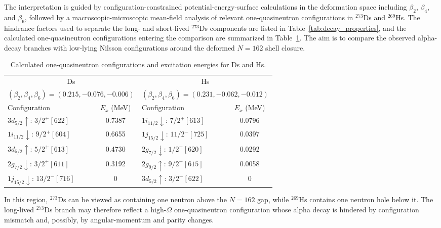 \documentclass[11pt]{article}
\begin{document}
The interpretation is guided by configuration-constrained potential-energy-surface calculations in the deformation space including $\beta_2$, $\beta_4$, and $\beta_6$, followed by a macroscopic-microscopic mean-field analysis of relevant one-quasineutron configurations in $^{273}$Ds and $^{269}$Hs. The hindrance factors used to separate the long- and short-lived $^{273}$Ds components are listed in Table~\ref{tab:decay_properties}, and the calculated one-quasineutron configurations entering the comparison are summarized in Table~\ref{tab:configurations_Ds_Hs}. The aim is to compare the observed alpha-decay branches with low-lying Nilsson configurations around the deformed $N=162$ shell closure.
\begin{table}[htbp]
    \centering
    \caption{Calculated one-quasineutron configurations and excitation energies for Ds and Hs.}
    \label{tab:configurations_Ds_Hs}
    \begin{tabular}{l c l c}
        \toprule
        \multicolumn{2}{c}{Ds} &
        \multicolumn{2}{c}{Hs} \\
        \multicolumn{2}{c}{$(\beta_2,\beta_4,\beta_6)
        =(0.215,-0.076,-0.006)$} &
        \multicolumn{2}{c}{$(\beta_2,\beta_4,\beta_6)
        =(0.231,-0.062,-0.012)$} \\
        \cmidrule(lr){1-2}
        \cmidrule(lr){3-4}
        Configuration & $E_x$ (MeV) &
        Configuration & $E_x$ (MeV) \\
        \midrule
        $3d_{5/2}\uparrow:\,3/2^{+}[622]$
            & 0.7387
            & $1i_{11/2}\downarrow:\,7/2^{+}[613]$
            & 0.0796 \\
        $1i_{11/2}\downarrow:\,9/2^{+}[604]$
            & 0.6655
            & $1j_{15/2}\downarrow:\,11/2^{-}[725]$
            & 0.0397 \\
        $3d_{5/2}\uparrow:\,5/2^{+}[613]$
            & 0.4730
            & $2g_{7/2}\downarrow:\,1/2^{+}[620]$
            & 0.0292 \\
        $2g_{7/2}\downarrow:\,3/2^{+}[611]$
            & 0.3192
            & $2g_{9/2}\uparrow:\,9/2^{+}[615]$
            & 0.0058 \\
        $1j_{15/2}\downarrow:\,13/2^{-}[716]$
            & 0
            & $3d_{5/2}\uparrow:\,3/2^{+}[622]$
            & 0 \\
        \bottomrule
    \end{tabular}
\end{table}

In this region, $^{273}$Ds can be viewed as containing one neutron above the $N=162$ gap, while $^{269}$Hs contains one neutron hole below it. 
The long-lived $^{273}$Ds branch may therefore reflect a high-$\Omega$ one-quasineutron configuration whose alpha decay is hindered by configuration mismatch and, possibly, by angular-momentum and parity changes.
\end{document}

